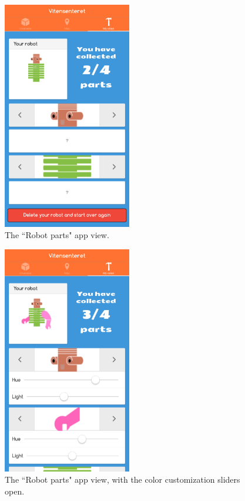 \begin{figure}[H]
    \centering
    \includegraphics[width=0.5\textwidth]{images/app/parts.png}
    \caption{The ``Robot parts" app view.}
    \label{fig:parts}
\end{figure}


\begin{figure}[H]
    \centering
    \includegraphics[width=0.5\textwidth]{images/app/parts_colors.png}
    \caption{The ``Robot parts" app view, with the color customization sliders open.}
    \label{fig:parts_colors}
\end{figure}



